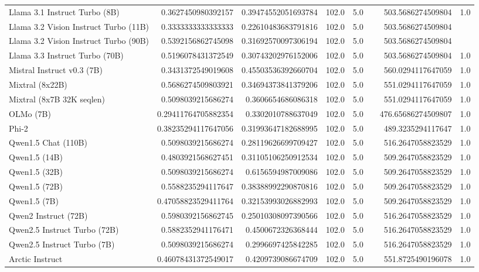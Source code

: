 \begin{table}[htp]
{\begin{tabular}{lrrrrrrr}
Llama 3.1 Instruct Turbo (8B) & 0.3627450980392157 & 0.39474552051693784 & 102.0 & 5.0 &  & 503.5686274509804 & 1.0 \\
Llama 3.2 Vision Instruct Turbo (11B) & 0.3333333333333333 & 0.22610483683791816 & 102.0 & 5.0 &  & 503.5686274509804 &  \\
Llama 3.2 Vision Instruct Turbo (90B) & 0.5392156862745098 & 0.31692570097306194 & 102.0 & 5.0 &  & 503.5686274509804 &  \\
Llama 3.3 Instruct Turbo (70B) & 0.5196078431372549 & 0.30743202976152006 & 102.0 & 5.0 &  & 503.5686274509804 & 1.0 \\
Mistral Instruct v0.3 (7B) & 0.3431372549019608 & 0.45503536392660704 & 102.0 & 5.0 &  & 560.0294117647059 & 1.0 \\
Mixtral (8x22B) & 0.5686274509803921 & 0.34694373841379206 & 102.0 & 5.0 &  & 551.0294117647059 & 1.0 \\
Mixtral (8x7B 32K seqlen) & 0.5098039215686274 & 0.3606654686086318 & 102.0 & 5.0 &  & 551.0294117647059 & 1.0 \\
OLMo (7B) & 0.29411764705882354 & 0.3302010788637049 & 102.0 & 5.0 &  & 476.65686274509807 & 1.0 \\
Phi-2 & 0.38235294117647056 & 0.31993647182688995 & 102.0 & 5.0 &  & 489.3235294117647 & 1.0 \\
Qwen1.5 Chat (110B) & 0.5098039215686274 & 0.28119626699709427 & 102.0 & 5.0 &  & 516.2647058823529 & 1.0 \\
Qwen1.5 (14B) & 0.4803921568627451 & 0.31105106250912534 & 102.0 & 5.0 &  & 509.2647058823529 & 1.0 \\
Qwen1.5 (32B) & 0.5098039215686274 & 0.6156594987009086 & 102.0 & 5.0 &  & 509.2647058823529 & 1.0 \\
Qwen1.5 (72B) & 0.5588235294117647 & 0.38388992290870816 & 102.0 & 5.0 &  & 509.2647058823529 & 1.0 \\
Qwen1.5 (7B) & 0.47058823529411764 & 0.32153993026882993 & 102.0 & 5.0 &  & 509.2647058823529 & 1.0 \\
Qwen2 Instruct (72B) & 0.5980392156862745 & 0.25010308097390566 & 102.0 & 5.0 &  & 516.2647058823529 & 1.0 \\
Qwen2.5 Instruct Turbo (72B) & 0.5882352941176471 & 0.4500672326368444 & 102.0 & 5.0 &  & 516.2647058823529 & 1.0 \\
Qwen2.5 Instruct Turbo (7B) & 0.5098039215686274 & 0.2996697425842285 & 102.0 & 5.0 &  & 516.2647058823529 & 1.0 \\
Arctic Instruct & 0.46078431372549017 & 0.4209739086674709 & 102.0 & 5.0 &  & 551.8725490196078 & 1.0 \\

\end{tabular}}
\end{table}
